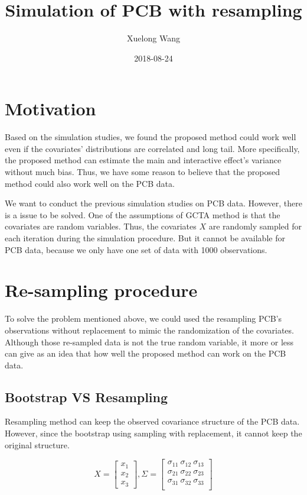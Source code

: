 \documentclass[]{article}
\title{Simulation of PCB with resampling}
\author{Xuelong Wang}
\date{2018-08-24}
\begin{document}
\maketitle

{
\setcounter{tocdepth}{2}
\tableofcontents
}
\section{Motivation}\label{motivation}

Based on the simulation studies, we found the proposed method could work
well even if the covariates' distributions are correlated and long tail.
More specifically, the proposed method can estimate the main and
interactive effect's variance without much bias. Thus, we have some
reason to believe that the proposed method could also work well on the
PCB data.

We want to conduct the previous simulation studies on PCB data. However,
there is a issue to be solved. One of the assumptions of GCTA method is
that the covariates are random variables. Thus, the covariates \(X\) are
randomly sampled for each iteration during the simulation procedure. But
it cannot be available for PCB data, because we only have one set of
data with 1000 observations.

\section{Re-sampling procedure}\label{re-sampling-procedure}

To solve the problem mentioned above, we could used the resampling PCB's
observations without replacement to mimic the randomization of the
covariates. Although those re-sampled data is not the true random
variable, it more or less can give as an idea that how well the proposed
method can work on the PCB data.

\subsection{Bootstrap VS Resampling}\label{bootstrap-vs-resampling}

Resampling method can keep the observed covariance structure of the PCB
data. However, since the bootstrap using sampling with replacement, it
cannot keep the original structure.

\[
  X = \begin{bmatrix}   
        x_1\\
        x_2\\
        x_3
      \end{bmatrix},
  \Sigma = \begin{bmatrix}   
        \sigma_{11} ~ \sigma_{12} ~ \sigma_{13}\\
        \sigma_{21} ~ \sigma_{22} ~ \sigma_{23}\\
        \sigma_{31} ~ \sigma_{32} ~ \sigma_{33}\\
      \end{bmatrix}
\]
\end{document}
